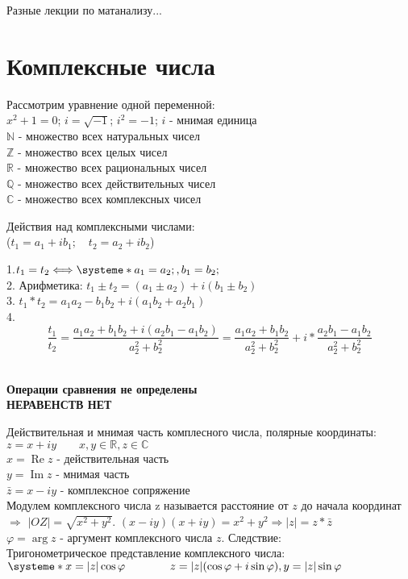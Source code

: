 \documentclass[14pt,a4paper]{scrartcl}
\theoremstyle{definition}
\newtheorem{defo}{Означення}[section]
\theoremstyle{remark}
\theoremstyle{definition}
\theoremstyle{definition}
\begin{document}
\def\be{\begin{equation}}
\def\ee{\end{equation}}

\def\bd{\begin{defo}}
\def\ed{\end{defo}}

\def\bbt{\begin{boxteo}}
\def\ebt{\end{boxteo}}
{\Huge \centering Разные лекции по матанализу...}
\tableofcontents
\pagebreak
\section{Комплексные числа}
Рассмотрим уравнение одной переменной:\\
$ x^2 + 1 = 0$; \qquad
$ i = \sqrt{-1}$; \qquad
$ i^2 = -1 $; \qquad $i$ - мнимая единица\\
$\mathbb{N}$ - множество всех натуральных чисел\\
$\mathbb{Z}$ - множество всех целых чисел\\
$\mathbb{R}$ - множество всех рациональных чисел\\
$\mathbb{Q}$ - множество всех действительных чисел\\
$\mathbb{C}$ - множество всех комплексных чисел\\
\begin{center}
Действия над комплексными числами:\\
($t_1 = a_1 + ib_1;\quad t_2 = a_2 + ib_2$)
\end{center}
1.\qquad $t_1 = t_2 \Longleftrightarrow
\systeme*{a_1 = a_2;, b_1 = b_2;}
$\\
2. Арифметика: $t_1 \pm t_2 = (a_1 \pm a_2) + i(b_1 \pm b_2)$\\
3. $t_1*t_2 = a_1a_2 - b_1b_2 + i(a_1b_2 + a_2b_1)$\\
4. \[\frac{t_1}{t_2} = \frac{a_1a_2 + b_1b_2 + i(a_2b_1 - a_1b_2)}{a_2^2 + b_2^2} = \frac{a_1a_2 + b_1b_2 }{a_2^2 + b_2^2} + i*\frac{a_2b_1 - a_1b_2}{a_2^2 + b_2^2}\]\\

\begin{center}
{\textbf{Операции сравнения не определены \\ НЕРАВЕНСТВ НЕТ}}
\end{center}
Действительная и мнимая часть комплесного числа, полярные координаты:
$z = x + iy \qquad x,y \in \mathbb{R}, z \in \mathbb{C}$\\
$x = \operatorname{Re}z$ - действительная часть\\
$y = \operatorname{Im}z$ - мнимая часть\\
$\bar{z} = x - iy$ - комплексное сопряжение\\
Модулем комплексного числа z называется расстояние от $z$ до начала координат $\Rightarrow$
$\vert OZ \vert = \sqrt{x^2 + y^2}$. \quad
$(x-iy)(x+iy) = x^2 + y^2 \Rightarrow  |z|= z*\bar{z}$ \\
$\varphi = \operatorname{arg} z$ - аргумент комплексного числа $z$. Следствие:\\
Тригонометрическое представление комплексного числа:\\
$\systeme*{x = |z|\cos{\varphi}\qquad\qquad z = |z|(\cos{\varphi} + i\sin{\varphi}) , y = |z|\sin{\varphi}}$
\pagebreak
\end{document}
